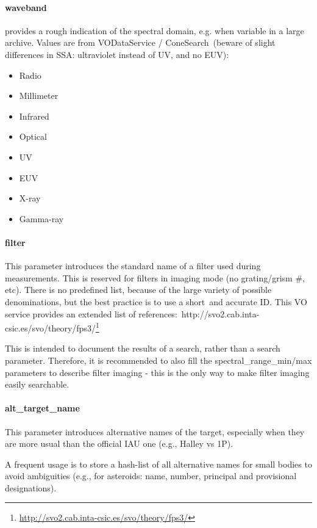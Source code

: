 \documentclass[11pt,a4paper]{ivoa}
\begin{document}
\paragraph{waveband}

provides a rough indication of the spectral domain, e.g. when variable in a large archive. Values are from VODataService / ConeSearch (beware of slight differences in SSA: ultraviolet instead of UV, and no EUV): 

\begin{itemize}
\item Radio
\item Millimeter
\item Infrared
\item Optical
\item UV
\item EUV
\item X-ray
\item Gamma-ray
\end{itemize}

\paragraph{filter}

This parameter introduces the standard name of a filter used during measurements. This is reserved for filters in imaging mode (no grating/grism \#, etc). There is no predefined list, because of the large variety of possible denominations, but the best practice is to use a short and accurate ID. This VO service provides an extended list of references: http://svo2.cab.inta-csic.es/svo/theory/fps3/\footnote{\url{http://svo2.cab.inta-csic.es/svo/theory/fps3/}}

This is intended to document the results of a search, rather than a search parameter. Therefore, it is recommended to also fill the spectral\_range\_min/max parameters to describe filter imaging - this is the only way to make filter imaging easily searchable.

\paragraph{alt\_target\_name}

This parameter introduces alternative names of the target, especially when they are more usual than the official IAU one (e.g., Halley vs 1P).

A frequent usage is to store a hash-list of all alternative names for small bodies to avoid ambiguities (e.g., for asteroids: name, number, principal and provisional designations).
\end{document}
